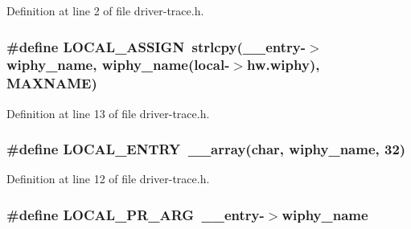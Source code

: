 Definition at line 2 of file driver-\/trace.\-h.

\hypertarget{driver-trace_8h_ab19d9141887ea92ef9640df06a51e0a1}{
\subsubsection[{L\-O\-C\-A\-L\-\_\-\-A\-S\-S\-I\-G\-N}]{\setlength{\rightskip}{0pt plus 5cm}\#define L\-O\-C\-A\-L\-\_\-\-A\-S\-S\-I\-G\-N~strlcpy(\-\_\-\-\_\-entry-\/$>$wiphy\-\_\-name, wiphy\-\_\-name(local-\/$>$hw.\-wiphy), {\bf M\-A\-X\-N\-A\-M\-E})}}\label{driver-trace_8h_ab19d9141887ea92ef9640df06a51e0a1}


Definition at line 13 of file driver-\/trace.\-h.

\hypertarget{driver-trace_8h_a70464a6fcf42a8540b6e5b4b5530437f}{
\subsubsection[{L\-O\-C\-A\-L\-\_\-\-E\-N\-T\-R\-Y}]{\setlength{\rightskip}{0pt plus 5cm}\#define L\-O\-C\-A\-L\-\_\-\-E\-N\-T\-R\-Y~\-\_\-\-\_\-array(char, wiphy\-\_\-name, 32)}}\label{driver-trace_8h_a70464a6fcf42a8540b6e5b4b5530437f}


Definition at line 12 of file driver-\/trace.\-h.

\hypertarget{driver-trace_8h_aa2a77a17621ecb4f0b3926fec90a5538}{
\subsubsection[{L\-O\-C\-A\-L\-\_\-\-P\-R\-\_\-\-A\-R\-G}]{\setlength{\rightskip}{0pt plus 5cm}\#define L\-O\-C\-A\-L\-\_\-\-P\-R\-\_\-\-A\-R\-G~\-\_\-\-\_\-entry-\/$>$wiphy\-\_\-name}}\label{driver-trace_8h_aa2a77a17621ecb4f0b3926fec90a5538}


